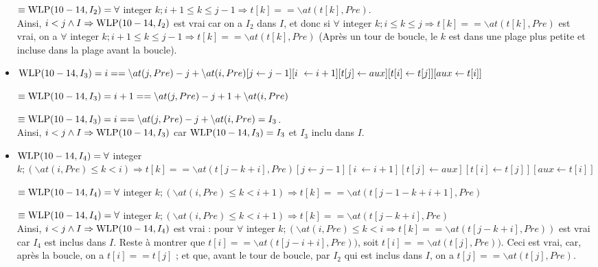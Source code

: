 \documentclass[11pt,answers]{exam}
\begin{document}
\begin{questions}
\begin{parts}
\begin{solutionorbox}
\begin{itemize}
                $\equiv \mathrm{WLP}(10-14,I_2) =\forall$ integer $k; i+1 \leq k \leq j-1 \Rightarrow t[k] == \backslash at(t[k], Pre)$. \\

                  Ainsi,  $i < j \land I \Rightarrow \mathrm{WLP}(10-14,I_2)$ est vrai car on a $I_2$ dans $I$, et donc si $\forall$ integer $k; i \leq k \leq j \Rightarrow t[k] == \backslash at(t[k], Pre)$ est vrai, on a $\forall$ integer $k; i+1 \leq k \leq j-1 \Rightarrow t[k] == \backslash at(t[k], Pre)$ (Après un tour de boucle, le $k$ est dans une plage plus petite et incluse dans la plage avant la boucle).

            \item $\WLP(10-14,I_3) = i == \backslash at(j, Pre) -j  + \backslash at(i, Pre ) [j \leftarrow j-1][i \ \leftarrow i+1][t[j] \leftarrow aux][t[i] \leftarrow t[j]][aux \leftarrow t[i]]$

                    $ \equiv \mathrm{WLP}(10-14,I_3) = i+1 == \backslash at(j, Pre) -j +1  + \backslash at(i, Pre )$

                $\equiv \mathrm{WLP}(10-14,I_3) = i == \backslash at(j, Pre) -j  + \backslash at(i, Pre ) = I_3$. \\

                Ainsi, $i < j \land I \Rightarrow \mathrm{WLP}(10-14,I_3)$ car $\mathrm{WLP}(10-14,I_3) = I_3$ et $I_3$ inclu dans $I$.
            
            \item  $\mathrm{WLP}(10-14,I_4) = \forall$ integer $k; (\backslash at(i, Pre) \leq k<i) \Rightarrow t[k] == \backslash at(t[j- k + i], Pre)[j \leftarrow j-1][i \ \leftarrow i+1][t[j] \leftarrow aux][t[i] \leftarrow t[j]][aux \leftarrow t[i]]$

             $\equiv \mathrm{WLP}(10-14,I_4) = \forall$ integer $k; (\backslash at(i, Pre) \leq k<i+1) \Rightarrow t[k] == \backslash at(t[j-1- k + i+1], Pre)$

            $\equiv \mathrm{WLP}(10-14,I_4) = \forall$ integer $k; (\backslash at(i, Pre) \leq k<i+1) \Rightarrow t[k] == \backslash at(t[j- k + i], Pre)$ \\

                Ainsi, $i < j \land I \Rightarrow \mathrm{WLP}(10-14,I_4)$ est vrai : pour $ \forall$ integer $k; (\backslash at(i, Pre) \leq k<i \Rightarrow t[k] == \backslash at(t[j- k + i], Pre))$ est vrai car $I_4$ est inclus dans $I$.
                Reste à montrer que $t[i] == \backslash at(t[j- i + i], Pre))$, soit  $t[i] == \backslash at(t[j], Pre))$.
                Ceci est vrai, car, après la boucle, on a $t[i] == t[j]$ ; et que, avant le tour de boucle, par $I_2$ qui est inclus dans $I$, on a $t[j] == \backslash at(t[j], Pre)$.


\end{itemize}
\end{solutionorbox}
\end{parts}
\end{questions}
\end{document}
